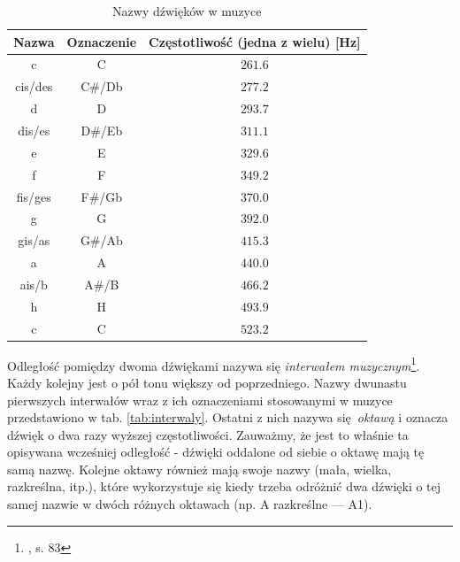 \begin{table}[htb]
    \centering
    \caption{Nazwy dźwięków w muzyce}
    \label{tab:nazwy_dzwiekow}
    \begin{tabular}{|c|c|c|} \hline
        Nazwa & Oznaczenie & Częstotliwość (jedna z wielu) [Hz] \\ \hline
        c       & C     & $261.6$  \\
        cis/des & C\#/Db & $277.2$  \\
        d       & D     & $293.7$  \\
        dis/es  & D\#/Eb & $311.1$  \\
        e       & E     & $329.6$  \\
        f       & F     & $349.2$  \\
        fis/ges & F\#/Gb & $370.0$  \\
        g       & G     & $392.0$  \\
        gis/as  & G\#/Ab & $415.3$  \\
        a       & A     & $440.0$  \\
        ais/b   & A\#/B  & $466.2$  \\
        h       & H     & $493.9$  \\
        c       & C     & $523.2$  \\ \hline
    \end{tabular}
\end{table}

Odległość pomiędzy dwoma dźwiękami nazywa się \emph{interwałem muzycznym}\footnote{\cite{lerch_introduction_2012}, s.  83}. Każdy kolejny jest o pół tonu większy od poprzedniego. Nazwy dwunastu pierwszych interwałów wraz z ich oznaczeniami stosowanymi w muzyce przedstawiono w tab. \ref{tab:interwaly}. Ostatni z nich nazywa się \emph{oktawą} i oznacza dźwięk o dwa razy wyższej częstotliwości. Zauważmy, że jest to właśnie ta opisywana wcześniej odległość - dźwięki oddalone od siebie o oktawę mają tę samą nazwę.  Kolejne oktawy również mają swoje nazwy (mała, wielka, razkreślna, itp.), które wykorzystuje się kiedy trzeba odróżnić dwa dźwięki o tej samej nazwie w dwóch różnych oktawach (np. A razkreślne --- A1).

